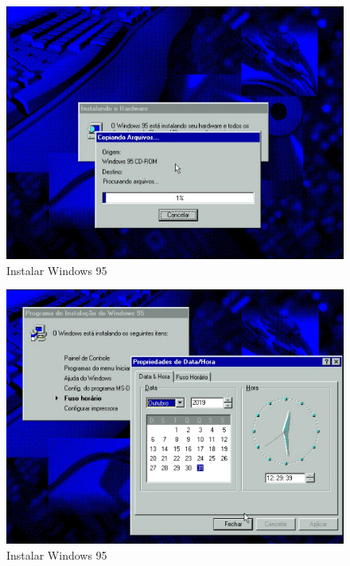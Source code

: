 \documentclass{report}
\begin{document}
\begin{figure}
\centering
\includegraphics[width=\textwidth]{Screenshot_48.png}
\caption{Instalar Windows 95}
\label{fig:48}
\end{figure}

\begin{figure}
\centering
\includegraphics[width=\textwidth]{Screenshot_49.png}
\caption{Instalar Windows 95}
\label{fig:49}
\end{figure}
\end{document}
